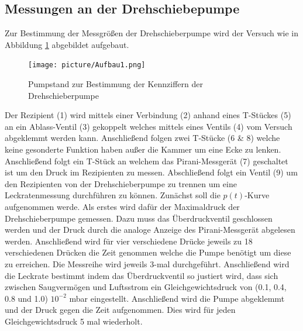 \subsection{Messungen an der Drehschiebepumpe}
Zur Bestimmung der Messgrößen der Drehschieberpumpe wird der Versuch wie in Abbildung \ref{fig:Dreh} abgebildet aufgebaut.
\begin{figure}[htpb]
  \centering
  \texttt{[image: picture/Aufbau1.png]}
  \caption{Pumpstand zur Bestimmung der Kennziffern der Drehschieberpumpe}
  \label{fig:Dreh}
\end{figure}
Der Rezipient (1) wird mittels einer Verbindung (2) anhand eines T-Stückes (5) an ein Ablass-Ventil (3) gekoppelt welches mittels eines Ventils (4) vom Versuch abgeklemmt werden kann. Anschließend folgen zwei T-Stücke (6 \& 8) welche keine gesonderte Funktion haben außer die Kammer um eine Ecke zu lenken. Anschließend folgt ein T-Stück an welchem das Pirani-Messgerät (7) geschaltet ist um den Druck im Rezipienten zu messen. Abschließend folgt ein Ventil (9) um den Rezipienten von der Drehschieberpumpe zu trennen um eine Leckratenmessung durchführen zu können. \newline
Zunächst soll die $p(t)$-Kurve aufgenommen werde. Als erstes wird dafür der Maximaldruck der Drehschieberpumpe gemessen. Dazu muss das Überdruckventil geschlossen werden und der Druck durch die analoge Anzeige des Pirani-Messgerät abgelesen werden. Anschließend wird für vier verschiedene Drücke jeweils zu 18 verschiedenen Drücken die Zeit genommen welche die Pumpe benötigt um diese zu erreichen. Die Messreihe wird jeweils 3-mal durchgeführt. \newline
Anschließend wird die Leckrate bestimmt indem das Überdruckventil so justiert wird, dass sich zwischen Saugvermögen und Luftsstrom ein Gleichgewichtsdruck von (0.1, 0.4, 0.8 und 1.0) \cdot $10^{-2}$ mbar eingestellt. Anschließend wird die Pumpe abgeklemmt und der Druck gegen die Zeit aufgenommen. Dies wird für jeden Gleichgewichtsdruck 5 mal wiederholt.  \newline
